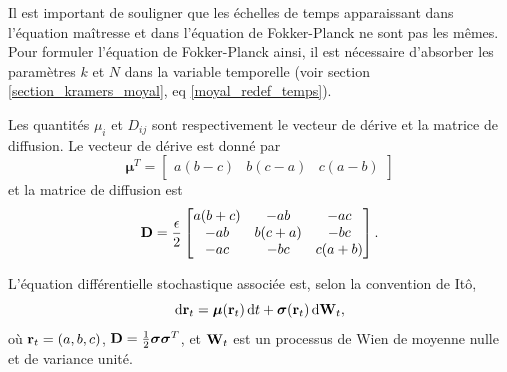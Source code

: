 \documentclass[openany,a4paper,12pt]{article}
\begin{document}
\par Il est important de souligner que les échelles de temps apparaissant dans l'équation maîtresse et dans l'équation de Fokker-Planck ne sont pas les mêmes. Pour formuler l'équation de Fokker-Planck ainsi, il est nécessaire d'absorber les paramètres $k$ et $N$ dans la variable temporelle (voir section \ref{section_kramers_moyal}, eq \ref{moyal_redef_temps}). 

\par Les quantités $\mu_i$ et $D_{ij}$ sont respectivement le vecteur de dérive et la matrice de diffusion. Le vecteur de dérive est donné par 
%
\begin{equation}\label{mu_i_expr}
	\boldsymbol\mu^T = 
	\begin{bmatrix} a(b-c) & b(c-a) & c(a-b) \end{bmatrix}
\end{equation}
%
et la matrice de diffusion est
%
\begin{equation}\label{D_ij_expr}
	\bold D = \frac{\epsilon}{2}
	\begin{bmatrix}
	a(b+c) & -ab & -ac \\
	-ab & b(c+a) & -bc \\
	-ac & -bc & c(a+b)
	\end{bmatrix}.
\end{equation}
%

\par L'équation différentielle stochastique associée est, selon la convention de Itô,
%
\begin{equation}\label{SDE_abc}
	\dd \bold r_t = \boldsymbol \mu (\bold r_t) \, \dd t + \boldsymbol \sigma(\bold r_t) \, \dd \bold W_t,
\end{equation}
où $\bold r_t = (a,b,c)$, $\bold D = \frac 12 \boldsymbol \sigma \boldsymbol \sigma^T$, et $\bold W_t$ est un processus de Wien de moyenne nulle et de variance unité.
\end{document}
